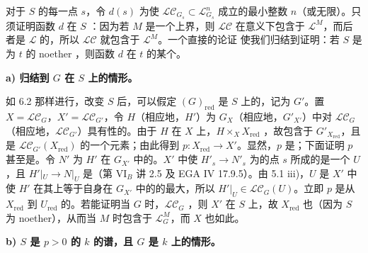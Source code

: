 对于 $S$ 的每一点 $s$，令 $d(s)$ 为使 $\mathscr L\mathscr C_{G_s}\subset\mathscr L_{G_s}^n$ 成立的最小整数 $n$（或无限）。只须证明函数 $d$ 在 $S$ ：因为若 $M$ 是一个上界，则 $\mathscr L\mathscr C$ 在意义下包含于 $\mathscr L^M$，而后者是 $\mathscr L$ 的，所以 $\mathscr L\mathscr C$ 就包含于 $\mathscr L^M$。一个直接的论证
使我们归结到证明：若 $S$ 是为 $t$ 的 noether ，则函数 $d$ 在 $t$ 的某个。

\textbf{a) 归结到 $G$ 在 $S$ 上的情形。}

如 6.2 那样进行，改变 $S$ 后，可以假定 $(G)_{\mathrm{red}}$ 是 $S$ 上的，记为 $G'$。置 $X=\mathscr L\mathscr C_G$，$X'=\mathscr L\mathscr C_{G'}$，令 $H$（相应地，$H'$）为 $G_X$（相应地，$G'_{X'}$）中对 $\mathscr L\mathscr C_G$（相应地，$\mathscr L\mathscr C_{G'}$）具有性的。由于 $H$ 在 $X$ 上，$H\times_XX_{\mathrm{red}}$ ，故包含于 $G'_{X_{\mathrm{red}}}$，且是 $\mathscr L\mathscr C_{G'}(X_{\mathrm{red}})$ 的一个元素；由此得到 $p:X_{\mathrm{red}}\to X'$。显然，$p$ 是；下面证明 $p$ 甚至是。令 $N'$ 为 $H'$ 在 $G_{X'}$ 中的。$X'$ 中使 $H'_s\to N'_s$ 为的点 $s$ 所成的是一个 $U$，且 $H'|_U\to N|_U$ 是（第 VI$_B$ 讲 2.5 及 EGA IV 17.9.5）。由 5.1 iii)，$U$ 是 $X'$ 中使 $H'$ 在其上等于自身在 $G_{X'}$ 中的的最大，所以 $H'|_U\in\mathscr L\mathscr C_G(U)$。立即 $p$ 是从 $X_{\mathrm{red}}$ 到 $U_{\mathrm{red}}$ 的。若能证明当 $G$ 时，$\mathscr L\mathscr C_G$ ，则 $X'$ 在 $S$ 上，故 $X_{\mathrm{red}}$ 也（因为 $S$ 为 noether），从而当 $M$ 时包含于 $\mathscr L_G^M$，而 $X$ 也如此。

\textbf{b) $S$ 是 $p>0$ 的 $k$ 的谱，且 $G$ 是 $k$ 上的情形。}


